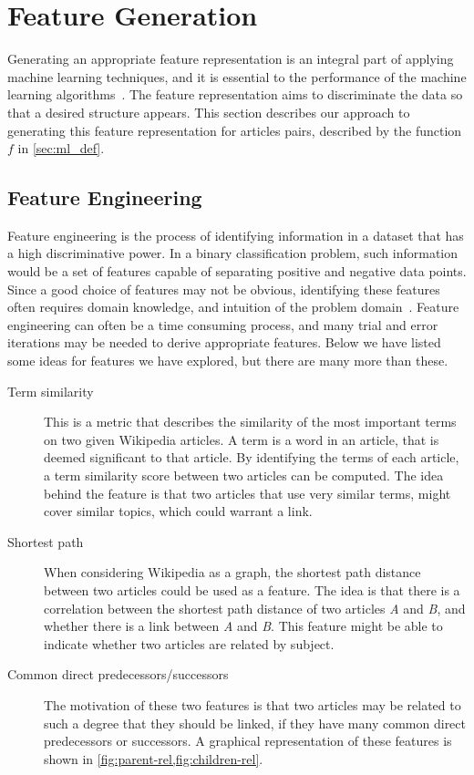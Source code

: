 \section{Feature Generation}\label{sec:feature_generation}
Generating an appropriate feature representation is an integral part of applying machine learning techniques, and it is essential to the performance of the machine learning algorithms~\cite{ng-lecture}. The feature representation aims to discriminate the data so that a desired structure appears. This section describes our approach to generating this feature representation for articles pairs, described by the function $f$ in \cref{sec:ml_def}.

\subsection{Feature Engineering}
Feature engineering is the process of identifying information in a dataset that has a high discriminative power. In a binary classification problem, such information would be a set of features capable of separating positive and negative data points. Since a good choice of features may not be obvious, identifying these features often requires domain knowledge, and intuition of the problem domain~\cite{ng-lecture,domingos2012few}. Feature engineering can often be a time consuming process, and many trial and error iterations may be needed to derive appropriate features. Below we have listed some ideas for features we have explored, but there are many more than these.

\begin{description}
    \item[Term similarity] This is a metric that describes the similarity of the most important terms on two given Wikipedia articles. A term is a word in an article, that is deemed significant to that article. By identifying the terms of each article, a term similarity score between two articles can be computed. The idea behind the feature is that two articles that use very similar terms, might cover similar topics, which could warrant a link.
    \item[Shortest path] When considering Wikipedia as a graph, the shortest path distance between two articles could be used as a feature. The idea is that there is a correlation between the shortest path distance of two articles \emph{A} and \emph{B}, and whether there is a link between \emph{A} and \emph{B}. This feature might be able to indicate whether two articles are related by subject.
    \item[Common direct predecessors/successors] The motivation of these two features is that two articles may be related to such a degree that they should be linked, if they have many common direct predecessors or successors. A graphical representation of these features is shown in \cref{fig:parent-rel,fig:children-rel}.
\end{description}

